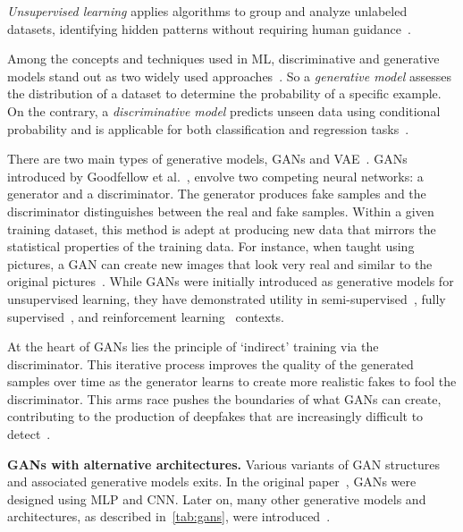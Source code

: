 \textit{Unsupervised learning} applies algorithms to group and analyze unlabeled datasets,
identifying hidden patterns without requiring human guidance~\cite{supervised-unsupervised}.

Among the concepts and techniques used in \ac{ML}, discriminative and generative models stand out
as two widely used approaches~\cite{generative-discriminative}. So a \textit{generative model}
assesses the distribution of a dataset to determine the probability of a specific example. On the
contrary, a \textit{discriminative model} predicts unseen data using conditional probability
and is applicable for both classification and regression tasks~\cite{generative-discriminative2}.

There are two main types of generative models, \ac{GAN}s and \ac{VAE}~\cite{generative-discriminative}. \ac{GAN}s
introduced by Goodfellow et al.~\cite{goodfellow2014generative}, envolve two
competing neural networks: a generator and a discriminator. The generator produces
fake samples and the discriminator distinguishes between the real and fake samples.
Within a given training dataset, this method is adept at producing new data that mirrors the
statistical properties of the training data. For instance, when taught using pictures, a \ac{GAN}
can create new images that look very real and similar to the original pictures~\cite{wikipedia-gans}.
While \ac{GAN}s were initially introduced as generative models for unsupervised learning,
they have demonstrated utility in semi-supervised~\cite{salimans2016improved},
fully supervised~\cite{pix2pix2017}, and reinforcement learning~\cite{ho2016generative} contexts.

At the heart of \ac{GAN}s lies the principle of `indirect' training via the discriminator.
This iterative process improves the quality of the generated samples over time as
the generator learns to create more realistic fakes to fool the discriminator. This
arms race pushes the boundaries of what \ac{GAN}s can create, contributing to the
production of deepfakes that are increasingly difficult to detect~\cite{brock2019large}.

\textbf{\ac{GAN}s with alternative architectures.} Various variants of \ac{GAN} structures
and associated generative models exits. In the original paper~\cite{goodfellow2014generative},
\ac{GAN}s were designed using \ac{MLP} and \ac{CNN}. Later on, many other generative models and
architectures, as described in~\autoref{tab:gans}, were introduced~\cite{gans-versions}.

